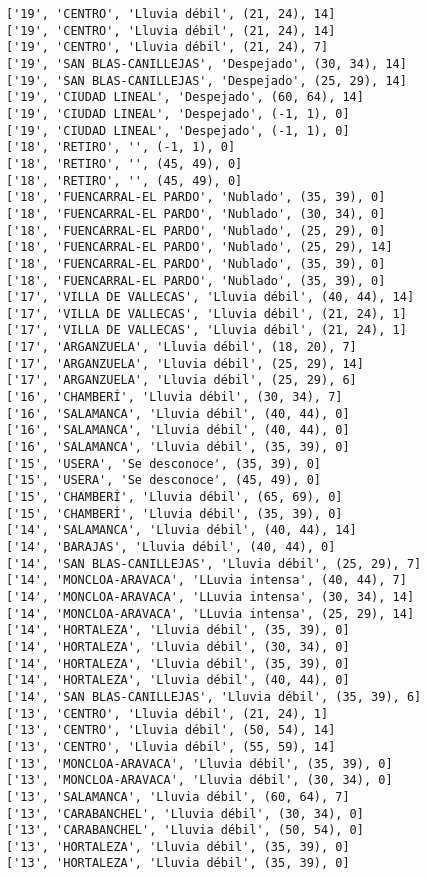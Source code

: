 \documentclass[11pt]{article}
\begin{document}
\begin{Verbatim}[commandchars=\\\{\}]
['19', 'CENTRO', 'Lluvia débil', (21, 24), 14]
['19', 'CENTRO', 'Lluvia débil', (21, 24), 14]
['19', 'CENTRO', 'Lluvia débil', (21, 24), 7]
['19', 'SAN BLAS-CANILLEJAS', 'Despejado', (30, 34), 14]
['19', 'SAN BLAS-CANILLEJAS', 'Despejado', (25, 29), 14]
['19', 'CIUDAD LINEAL', 'Despejado', (60, 64), 14]
['19', 'CIUDAD LINEAL', 'Despejado', (-1, 1), 0]
['19', 'CIUDAD LINEAL', 'Despejado', (-1, 1), 0]
['18', 'RETIRO', '', (-1, 1), 0]
['18', 'RETIRO', '', (45, 49), 0]
['18', 'RETIRO', '', (45, 49), 0]
['18', 'FUENCARRAL-EL PARDO', 'Nublado', (35, 39), 0]
['18', 'FUENCARRAL-EL PARDO', 'Nublado', (30, 34), 0]
['18', 'FUENCARRAL-EL PARDO', 'Nublado', (25, 29), 0]
['18', 'FUENCARRAL-EL PARDO', 'Nublado', (25, 29), 14]
['18', 'FUENCARRAL-EL PARDO', 'Nublado', (35, 39), 0]
['18', 'FUENCARRAL-EL PARDO', 'Nublado', (35, 39), 0]
['17', 'VILLA DE VALLECAS', 'Lluvia débil', (40, 44), 14]
['17', 'VILLA DE VALLECAS', 'Lluvia débil', (21, 24), 1]
['17', 'VILLA DE VALLECAS', 'Lluvia débil', (21, 24), 1]
['17', 'ARGANZUELA', 'Lluvia débil', (18, 20), 7]
['17', 'ARGANZUELA', 'Lluvia débil', (25, 29), 14]
['17', 'ARGANZUELA', 'Lluvia débil', (25, 29), 6]
['16', 'CHAMBERÍ', 'Lluvia débil', (30, 34), 7]
['16', 'SALAMANCA', 'Lluvia débil', (40, 44), 0]
['16', 'SALAMANCA', 'Lluvia débil', (40, 44), 0]
['16', 'SALAMANCA', 'Lluvia débil', (35, 39), 0]
['15', 'USERA', 'Se desconoce', (35, 39), 0]
['15', 'USERA', 'Se desconoce', (45, 49), 0]
['15', 'CHAMBERÍ', 'Lluvia débil', (65, 69), 0]
['15', 'CHAMBERÍ', 'Lluvia débil', (35, 39), 0]
['14', 'SALAMANCA', 'Lluvia débil', (40, 44), 14]
['14', 'BARAJAS', 'Lluvia débil', (40, 44), 0]
['14', 'SAN BLAS-CANILLEJAS', 'Lluvia débil', (25, 29), 7]
['14', 'MONCLOA-ARAVACA', 'LLuvia intensa', (40, 44), 7]
['14', 'MONCLOA-ARAVACA', 'LLuvia intensa', (30, 34), 14]
['14', 'MONCLOA-ARAVACA', 'LLuvia intensa', (25, 29), 14]
['14', 'HORTALEZA', 'Lluvia débil', (35, 39), 0]
['14', 'HORTALEZA', 'Lluvia débil', (30, 34), 0]
['14', 'HORTALEZA', 'Lluvia débil', (35, 39), 0]
['14', 'HORTALEZA', 'Lluvia débil', (40, 44), 0]
['14', 'SAN BLAS-CANILLEJAS', 'Lluvia débil', (35, 39), 6]
['13', 'CENTRO', 'Lluvia débil', (21, 24), 1]
['13', 'CENTRO', 'Lluvia débil', (50, 54), 14]
['13', 'CENTRO', 'Lluvia débil', (55, 59), 14]
['13', 'MONCLOA-ARAVACA', 'Lluvia débil', (35, 39), 0]
['13', 'MONCLOA-ARAVACA', 'Lluvia débil', (30, 34), 0]
['13', 'SALAMANCA', 'Lluvia débil', (60, 64), 7]
['13', 'CARABANCHEL', 'Lluvia débil', (30, 34), 0]
['13', 'CARABANCHEL', 'Lluvia débil', (50, 54), 0]
['13', 'HORTALEZA', 'Lluvia débil', (35, 39), 0]
['13', 'HORTALEZA', 'Lluvia débil', (35, 39), 0]

\end{Verbatim}
\end{document}
